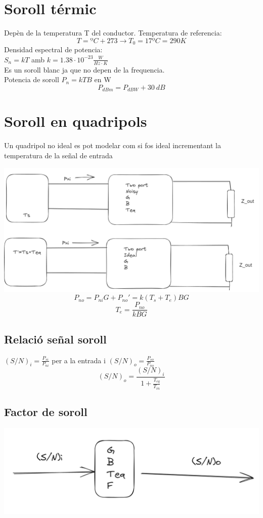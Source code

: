 \documentclass[a4paper,11pt]{article}
\begin{document}
\author[1]{Sergio Gómez}
\author[]{Apuntes ER}
\begin{multicols*}{2}
	\section{Soroll térmic}
	Depèn de la temperatura T del conductor.
	Temperatura de referencia:
	$$T=ºC+273\rightarrow T_0=17ºC=290K$$
	Densidad espectral de potencia:\\
	$S_n=kT$ amb $k=1.38\cdot10^{-23}\frac{W}{Hz\cdot K}$\\
	Es un soroll blanc ja que no depen de la frequencia.\\
	Potencia de soroll $P_n=kTB$ en W\\
	$$P_{dBm}=P_{dBW}+30\ dB$$
	 
	\section{Soroll en quadripols}
	Un quadripol no ideal es pot modelar com si fos ideal incrementant la temperatura de la señal de entrada
	
	\includegraphics[width=1\linewidth]{Screenshot 2023-10-21 123320.png}
	$$P_{no}=P_{ni}G+P_{no}'=k(T_s+T_e)BG$$
	$$T_e=\frac{P_{no}}{kBG}$$
	\subsection{Relació señal soroll}
	$(S/N)_i=\frac{P_{si}}{P_{ni}}$ per a la entrada i $(S/N)_o=\frac{P_{so}}{P_{no}}$
	$$(S/N)_o=\frac{(S/N)_i}{1+\frac{T_{eq}}{T_{in}}}$$
	\subsection{Factor de soroll}
	\includegraphics[width=1\linewidth]{quaddiagram.png}
		

\end{multicols*}
\end{document}
